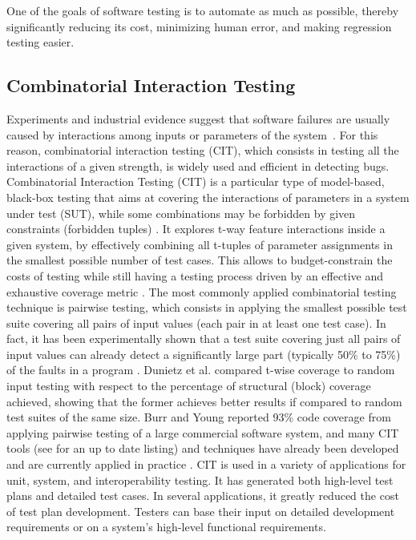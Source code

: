 One of the goals of software testing is to automate as much as possible, thereby significantly reducing its cost, minimizing human error, and making regression testing easier. \cite{testingbook}

\subsection{Combinatorial Interaction Testing}\label{sec:cit}
Experiments and industrial evidence suggest that software failures are usually caused by interactions among inputs or parameters of the system~\cite{Kuhn02}. For this reason, combinatorial interaction testing (CIT), which consists in testing all the interactions of a given strength, is widely used and efficient in detecting bugs. 
Combinatorial Interaction Testing (CIT) is a particular type of model-based, black-box testing that aims at covering the interactions of parameters in a system under test (SUT), while some combinations may be forbidden by given constraints (forbidden tuples) \cite{yamada_greedy_2016}.
It explores t-way feature interactions inside a given system, by effectively combining all t-tuples of parameter assignments in the smallest possible number of test cases.
This allows to budget-constrain the costs of testing while still having a testing process driven by an effective and exhaustive coverage metric \cite{AETG,KuhnTSE04}. 
The most commonly applied combinatorial testing technique is pairwise testing, which consists in applying the smallest possible test suite covering all pairs of input values (each pair in at least one test case). 
In fact, it has been experimentally shown that a test suite covering just all pairs of input values can already detect a significantly large part (typically 50\% to 75\%) of the faults in a program \cite{Dalal:ICSE99, IPO}.
Dunietz et al. \cite{Dunietz:ICSE97} compared t-wise coverage to random input testing with respect to the percentage of structural (block) coverage achieved, showing that the former achieves better results if compared to random test suites of the same size. 
Burr and Young \cite{burr98} reported 93\% code coverage from applying pairwise testing of a large commercial software system, and many CIT tools (see \cite{pairwise} for an up to date listing) and techniques have already been developed \cite{Dalal1998a,GrindalSTVR05,KuhnTSE04} and are currently applied in practice \cite{Brownlie1992a,Kuhn02,Smith}. 
CIT is used in a variety of applications for unit, system, and interoperability testing. 
It has generated both high-level test plans and detailed test cases. In several applications, it greatly reduced the cost of test plan development. Testers can base their input on detailed development requirements or on a system's high-level functional requirements.

